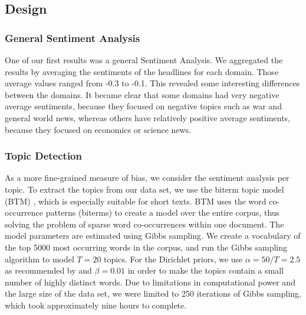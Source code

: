 \documentclass[final]{ieee}
\begin{document}
\subsection{Design}


\subsubsection{General Sentiment Analysis}

One of our first results was a general Sentiment Analysis. %
We aggregated the results by averaging the sentiments of the headlines for each domain. Those average values ranged from -0.3 to -0.1. %
This revealed some interesting differences between the domains. It became clear that some domains had very negative average sentiments, because they focused on negative topics such as war and general world news, whereas others have relatively positive average sentiments, because they focused on economics or science news. %

\subsubsection{Topic Detection}

As a more fine-grained measure of bias, we consider the sentiment analysis per topic. To extract the topics from our data set, we use the biterm topic model (BTM) \cite{BTM13}, which is especially suitable for short texts. BTM uses the word co-occurrence patterns (biterms) to create a model over the entire corpus, thus solving the problem of sparse word co-occurrences within one document. The model parameters are estimated using Gibbs sampling. We create a vocabulary of the top 5000 most occurring words in the corpus, and run the Gibbs sampling algorithm to model $T = 20$ topics. For the Dirichlet priors, we use $\alpha = 50/T = 2.5$ as recommended by \cite{FST13} and $\beta = 0.01$ in order to make the topics contain a small number of highly distinct words. Due to limitations in computational power and the large size of the data set, we were limited to 250 iterations of Gibbs sampling, which took approximately nine hours to complete.
\end{document}
